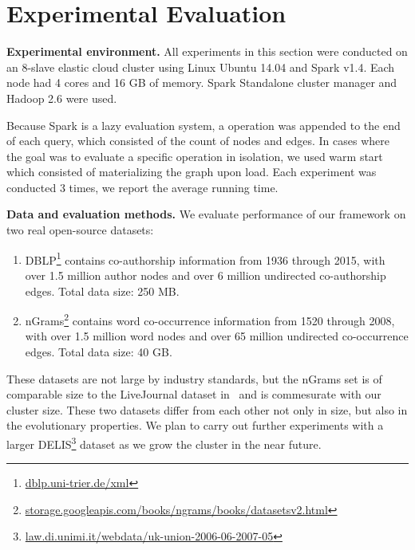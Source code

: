 \section{Experimental Evaluation}
\label{sec:exp}

{\bf Experimental environment.} All experiments in this section were
conducted on an 8-slave elastic cloud cluster using Linux Ubuntu 14.04
and Spark v1.4.  Each node had 4 cores and 16 GB of memory.  Spark
Standalone cluster manager and Hadoop 2.6 were used.

Because Spark is a lazy evaluation system, a 
operation was appended to the end of each query, which consisted of
the count of nodes and edges.  In cases where the goal was to evaluate
a specific operation in isolation, we used warm start which consisted
of materializing the graph upon load.  Each experiment was conducted 3
times, we report the average running time. 

{\bf Data and evaluation methods.}  We evaluate performance of our
framework on two real open-source datasets:

\begin{enumerate}%

\item DBLP\footnote{\url{dblp.uni-trier.de/xml}} contains
  co-authorship information from 1936 \linebreak through 2015, with over 1.5
  million author nodes and over 6 million undirected co-authorship
  edges.  Total data size: 250 MB.

\item nGrams\footnote{\url{storage.googleapis.com/books/ngrams/books/datasetsv2.html}}
  contains word co-occurrence information from 1520 through 2008, with
  over 1.5 million word nodes and over 65 million undirected
  co-occurrence edges.  Total data size: 40 GB.
\end{enumerate}

These datasets are not large by industry standards, but the nGrams set
is of comparable size to the LiveJournal dataset in~\cite{Xin2013} and
is commesurate with our cluster size.  These two datasets differ from
each other not only in size, but also in the evolutionary properties.
We plan to carry out further experiments with a larger
DELIS\footnote{\url{law.di.unimi.it/webdata/uk-union-2006-06-2007-05}}
dataset as we grow the cluster in the near future.

